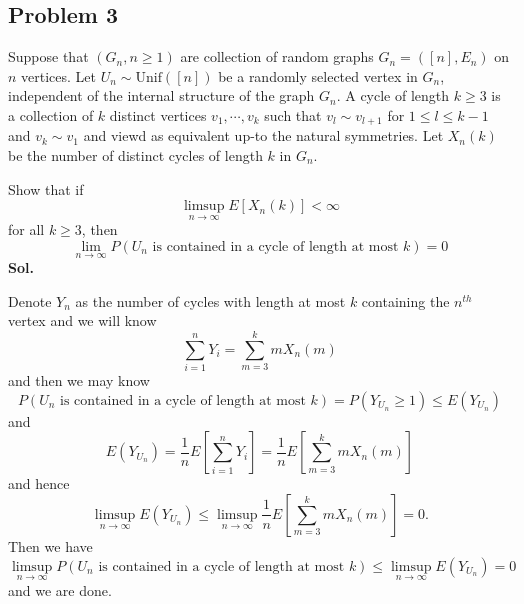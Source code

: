 \documentclass[lang=en,11pt,a4paper,citestyle =authoryear]{elegantpaper}
\begin{document}
\subsection*{Problem 3} 
Suppose that $(G_n, n\geq 1)$ are collection of random graphs $G_n = ([n],E_n)$ on $n$ vertices. Let $U_n \sim \text{Unif}([n])$ be a randomly selected vertex in $G_n$, independent of the internal structure of the graph $G_n$. A cycle of length $k\geq 3$ is a collection of $k$ distinct vertices $v_1,\cdots,v_k$ such that $v_l \sim v_{l+1}$ for $1\leq l\leq k-1$ and $v_k\sim v_1$ and viewd as equivalent up-to the natural symmetries. Let $X_n(k)$ be the number of distinct cycles of length $k$ in $G_n$.\par
Show that if
\[\limsup_{n\to\infty} E[X_n(k)] < \infty\]
for all $k\geq 3$, then
\[\lim_{n\to\infty} P(U_n\text{ is contained in a cycle of length at most }k ) = 0\]
\vspace{0.5em}
\textbf{Sol.} \par
Denote $Y_n$ as the number of cycles with length at most $k$ containing the $n^{th}$ vertex and we will know
\[
\sum\limits_{i=1}^n Y_i = \sum\limits_{m=3}^k mX_n(m)
\]
and then we may know
\[
P(U_n\text{ is contained in a cycle of length at most }k ) = P(Y_{U_n} \geq 1) \leq E(Y_{U_n})
\]
and
\[
E(Y_{U_n}) = \dfrac{1}{n}E\left[\sum\limits_{i=1}^n Y_i\right] = \dfrac{1}{n}E\left[\sum\limits_{m=3}^k mX_n(m)\right] 
\]
and hence
\[
\limsup_{n\to\infty} E(Y_{U_n}) \leq \limsup_{n\to\infty}\dfrac{1}{n}E\left[\sum\limits_{m=3}^k mX_n(m)\right]  = 0.
\]
Then we have
\[
\limsup_{n\to\infty} P(U_n\text{ is contained in a cycle of length at most }k ) \leq \limsup_{n\to\infty} E(Y_{U_n}) = 0
\]
and we are done.
\par 
\vspace{0.5em}

\addappheadtotoc
\end{document}
